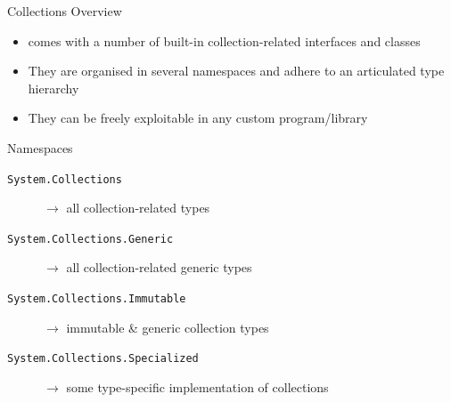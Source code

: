 \documentclass[presentation]{beamer}
\begin{document}
\begin{frame}[allowframebreaks]{\dotnet{} Collections Overview}

  \begin{itemize}
    \item \dotnet comes with a number of built-in collection-related interfaces and classes
    \item They are organised in several namespaces and adhere to an articulated type hierarchy
    \item They can be freely exploitable in any custom \dotnet program/library
  \end{itemize}

  \begin{block}{Namespaces}\small
    \begin{description}
      \item[\texttt{System.Collections}] $\rightarrow$ all collection-related types
      \item[\texttt{System.Collections.Generic}] $\rightarrow$ all collection-related \alert{generic} types 
      \item[\texttt{System.Collections.Immutable}] $\rightarrow$ \alert{immutable \& generic} collection types
      \item[\texttt{System.Collections.Specialized}] $\rightarrow$ some type-specific implementation of collections 
    \end{description}
  \end{block}
\end{frame}
\end{document}
